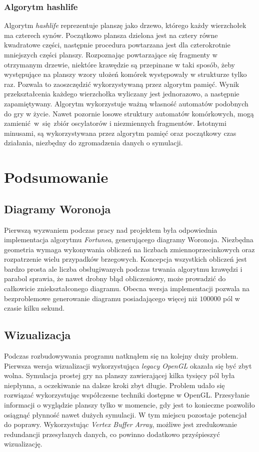\documentclass[declaration,shortabstract, inz]{iithesis}
\theoremstyle{definition} \newtheorem{definition}{Definicja}[]
\theoremstyle{plain} \newtheorem{remark}[definition]{Obserwacja}
\theoremstyle{plain} \newtheorem{theorem}[definition]{Twierdzenie}
\theoremstyle{plain} \newtheorem{example}{Przykład}[definition]
\theoremstyle{plain} \newtheorem{lemma}[definition]{Lemat}
\begin{document}
\subsection{Algorytm hashlife}
Algorytm \textit{hashlife} reprezentuje planszę jako drzewo, którego każdy wierzchołek ma czterech synów. Początkowo plansza dzielona jest na cztery równe kwadratowe części, następnie procedura powtarzana jest dla czterokrotnie mniejszych części planszy. Rozpoznając powtarzające się fragmenty w otrzymanym drzewie, niektóre krawędzie są przepinane w taki sposób, żeby występujące na planszy wzory ułożeń komórek występowały w strukturze tylko raz. Pozwala to zaoszczędzić wykorzystywaną przez algorytm pamięć. Wynik przekształcenia każdego wierzchołka wyliczany jest jednorazowo, a następnie zapamiętywany. Algorytm wykorzystuje ważną własność automatów podobnych do gry w życie. Nawet pozornie losowe struktury automatów komórkowych, mogą zamienić~w~się~zbiór oscylatorów i niezmiennych fragmentów. Istotnymi minusami, są wykorzystywana przez algorytm pamięć oraz początkowy czas działania, niezbędny do zgromadzenia danych o symulacji.

\chapter{Podsumowanie}

\section{Diagramy Woronoja}
Pierwszą wyzwaniem podczas pracy nad projektem była odpowiednia implementacja algorytmu \textit{Fortunea}, generującego diagramy Woronoja. Niezbędna geometria wymaga wykonywania obliczeń na liczbach zmiennoprzecinkowych oraz rozpatrzenie wielu przypadków brzegowych. Koncepcja wszystkich obliczeń jest bardzo prosta ale liczba obsługiwanych podczas trwania algorytmu krawędzi i parabol sprawia, że nawet drobny błąd obliczeniowy, może prowadzić do całkowicie zniekształconego diagramu. Obecna wersja implementacji pozwala na bezproblemowe generowanie diagramu posiadającego więcej niż $100000$ pól w czasie kilku sekund. 

\section{Wizualizacja}
Podczas rozbudowywania programu natknąłem się na kolejny duży problem. Pierwsza wersja wizualizacji wykorzystująca \textit{legacy OpenGL} okazała się być zbyt wolna. Symulacja prostej gry na planszy zawierającej kilka tysięcy pól była niepłynna, a oczekiwanie na dalsze kroki zbyt długie. Problem udało się rozwiązać wykorzystując współczesne techniki dostępne w OpenGL. Przesyłanie informacji o wyglądzie planszy tylko w momencie, gdy jest to konieczne pozwoliło osiągnąć płynność nawet dużych symulacji. W tym miejscu pozostaje potencjał do poprawy. Wykorzystując \textit{Vertex Buffer Array}, możliwe jest zredukowanie redundancji przesyłanych danych, co powinno dodatkowo przyśpieszyć wizualizację.
\end{document}
